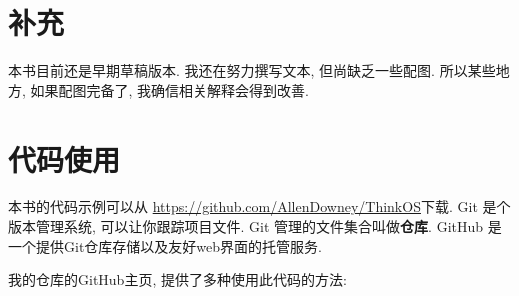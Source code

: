 \documentclass[12pt]{book}
\begin{document}
\section*{补充}

本书目前还是早期草稿版本. 
我还在努力撰写文本, 但尚缺乏一些配图.
所以某些地方, 如果配图完备了, 我确信相关解释会得到改善.

\section{代码使用}
\label{code}

本书的代码示例可以从
\url{https://github.com/AllenDowney/ThinkOS}下载.  
Git 是个版本管理系统, 可以让你跟踪项目文件. 
Git 管理的文件集合叫做{\bf 仓库}.
GitHub 是一个提供Git仓库存储以及友好web界面的托管服务.

我的仓库的GitHub主页, 提供了多种使用此代码的方法:
\end{document}
